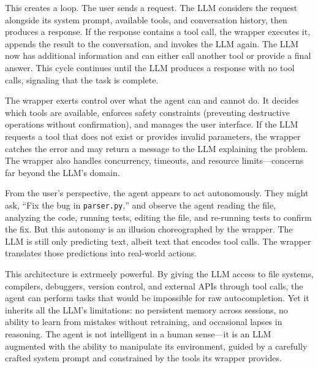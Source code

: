 This creates a loop. The user sends a request. The LLM considers the request alongside its system prompt, available tools, and conversation history, then produces a response. If the response contains a tool call, the wrapper executes it, appends the result to the conversation, and invokes the LLM again. The LLM now has additional information and can either call another tool or provide a final answer. This cycle continues until the LLM produces a response with no tool calls, signaling that the task is complete.

The wrapper exerts control over what the agent can and cannot do. It decides which tools are available, enforces safety constraints (preventing destructive operations without confirmation), and manages the user interface. If the LLM requests a tool that does not exist or provides invalid parameters, the wrapper catches the error and may return a message to the LLM explaining the problem. The wrapper also handles concurrency, timeouts, and resource limits---concerns far beyond the LLM's domain.

From the user's perspective, the agent appears to act autonomously. They might ask, ``Fix the bug in \texttt{parser.py},'' and observe the agent reading the file, analyzing the code, running tests, editing the file, and re-running tests to confirm the fix. But this autonomy is an illusion choreographed by the wrapper. The LLM is still only predicting text, albeit text that encodes tool calls. The wrapper translates those predictions into real-world actions.

This architecture is extrmeely powerful. By giving the LLM access to file systems, compilers, debuggers, version control, and external APIs through tool calls, the agent can perform tasks that would be impossible for raw autocompletion. Yet it inherits all the LLM's limitations: no persistent memory across sessions, no ability to learn from mistakes without retraining, and occasional lapses in reasoning. The agent is not intelligent in a human sense---it is an LLM augmented with the ability to manipulate its environment, guided by a carefully crafted system prompt and constrained by the tools its wrapper provides.

